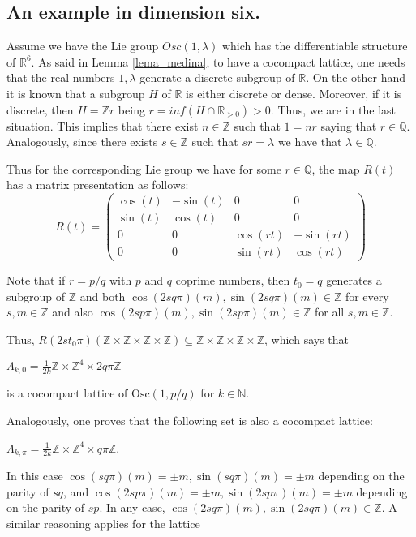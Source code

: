 \documentclass[12pt]{amsart}
\theoremstyle{plain}
\theoremstyle{definition}
\theoremstyle{remark}
\begin{document}
	\subsection{An example in dimension six.} Assume we have the Lie group $Osc(1,\lambda)$ which has the differentiable structure of $\mathbb R^6$. As said in Lemma \ref{lema_medina}, to have a cocompact lattice, one needs that the real numbers $1,\lambda$ generate a discrete subgroup of $\mathbb R$. 
		On the other hand it is known that a subgroup $H$ of $\mathbb R$ is either discrete or dense. Moreover, if it is discrete, then $H=\mathbb Z r$ being $r=inf(H\cap \mathbb R_{>0})>0$. Thus, we are  in  the last situation. 
	This implies that there exist $n\in \mathbb Z$ such that $1=nr$ saying that $r\in \mathbb Q$. Analogously, since there exists $s\in \mathbb Z$ such that $sr=\lambda$ we have that $\lambda \in \mathbb Q$. 
	
Thus for the corresponding Lie group we have for some $r\in \mathbb Q$, the map $R(t)$ has a matrix presentation as follows:
$$R(t)=\left( \begin{matrix} 
\cos(t) & -\sin(t) & 0 & 0\\
\sin(t) & \cos(t) &0 & 0\\
0 & 0 & \cos(r t) & -\sin(rt)\\
0 & 0 & \sin(rt) & \cos(rt)
\end{matrix}
\right)$$
 
 Note that if $r=p/q$ with $p$ and $q$ coprime numbers, then $t_0=q$ generates a subgroup of $\mathbb Z$ and both $\cos(2sq\pi)(m),\sin(2sq\pi)(m)\in \mathbb Z$ for every $s,m\in \mathbb Z$ and also $\cos(2sp\pi)(m),\sin(2sp\pi)(m)\in \mathbb Z$ for all $s,m\in \mathbb Z$. 
 
 Thus, $R(2st_0\pi)(\mathbb Z\times \mathbb Z\times \mathbb Z\times \mathbb Z)\subseteq \mathbb Z\times \mathbb Z\times \mathbb Z\times \mathbb Z$, which says that 
    
 $\Lambda_{k,0}=\frac1{2k} \mathbb Z\times \mathbb Z^4 \times 2q\pi\mathbb Z$ 
 
 is a cocompact lattice of $\mathrm{Osc}(1,p/q)$ for $k\in \mathbb N$.
 
 Analogously, one proves that the following set is also a cocompact lattice:
 
  $\Lambda_{k,\pi}=\frac1{2k} \mathbb Z\times \mathbb Z^4 \times q\pi\mathbb Z$. 
  
  In this case $\cos(sq\pi)(m)=\pm m,\sin(sq\pi)(m)=\pm m$ depending on the parity of $sq$, and  $\cos(2sp\pi)(m)=\pm m,\sin(2sp\pi)(m)=\pm m$  depending on the parity of $sp$. In any case, $\cos(2sq\pi)(m),\sin(2sq\pi)(m)\in \mathbb Z$. A similar reasoning applies for  the lattice 
  
\end{document}
